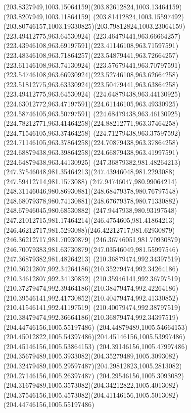 {{		\curveto(203.8327949,1003.15064159)(203.82612824,1003.13464159)(203.8207949,1003.11864159)
		\curveto(203.81412824,1003.15597492)(203.80746157,1003.19330825)(203.79812824,1003.23064159)
		\moveto(223.49412775,963.64530924)
		\curveto(223.46479441,963.66664257)(223.43946108,963.69197591)(223.41146108,963.71597591)
		\curveto(223.48346108,963.71864257)(223.54879441,963.72664257)(223.61146108,963.74130924)
		\curveto(223.57679441,963.70797591)(223.54746108,963.66930924)(223.52746108,963.62664258)
		\curveto(223.51812775,963.63330924)(223.50479441,963.63864258)(223.49412775,963.64530924)
		\moveto(224.64879438,963.44130925)
		\curveto(224.63012772,963.47197591)(224.61146105,963.49330925)(224.58746105,963.50797591)
		\curveto(224.68479438,963.46130925)(224.78212771,963.41464258)(224.88212771,963.37464258)
		\lineto(224.71546105,963.37464258)
		\curveto(224.71279438,963.37597592)(224.71146105,963.37864258)(224.70879438,963.37864258)
		\curveto(224.68879438,963.39864258)(224.66879438,963.41997591)(224.64879438,963.44130925)
		\moveto(247.36879382,981.48264213)
		\curveto(247.37546048,981.35464213)(247.43946048,981.2293088)(247.59412714,981.1573088)
		\curveto(247.94746047,980.99064214)(248.31146046,980.86930881)(248.68479378,980.76797548)
		\curveto(248.68079378,980.74130881)(248.67679378,980.71330882)(248.67946045,980.68530882)
		\curveto(247.9447938,980.93197548)(247.21012715,981.17464214)(246.4754605,981.41864213)
		\curveto(246.46212717,981.5293088)(246.42212717,981.62930879)(246.36212717,981.70930879)
		\lineto(246.36746051,981.70930879)
		\curveto(246.70079383,981.63730879)(247.03546049,981.55997546)(247.36879382,981.48264213)
		\moveto(210.36879474,992.34397519)
		\curveto(210.36212807,992.34264186)(210.35279474,992.34264186)(210.34612807,992.34130852)
		\curveto(210.35946141,992.36797519)(210.37279474,992.39464186)(210.38479474,992.42264186)
		\curveto(210.39546141,992.41730852)(210.40479474,992.41330852)(210.41546141,992.41197519)
		\curveto(210.40079474,992.38797519)(210.38479474,992.36664186)(210.36879474,992.34397519)
		\moveto(204.44746156,1005.55197486)
		\curveto(204.44879489,1005.54664153)(204.45012822,1005.54397486)(204.45146156,1005.53997486)
		\lineto(204.45146156,1005.53864153)
		\curveto(204.39146156,1005.47997486)(204.35679489,1005.3933082)(204.35279489,1005.3093082)
		\curveto(204.32479489,1005.29597487)(204.29812823,1005.2813082)(204.27146156,1005.26397487)
		\curveto(204.29546156,1005.3093082)(204.31679489,1005.3573082)(204.34212822,1005.4013082)
		\curveto(204.37546156,1005.4573082)(204.41146156,1005.5013082)(204.44746156,1005.55197486)
}}
